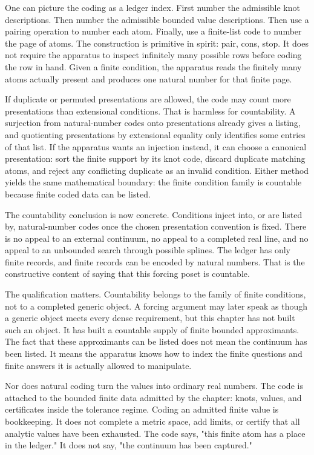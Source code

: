 One can picture the coding as a ledger index. First number the admissible knot
descriptions. Then number the admissible bounded value descriptions. Then use a
pairing operation to number each atom. Finally, use a finite-list code to number
the page of atoms. The construction is primitive in spirit: pair, cons, stop.
It does not require the apparatus to inspect infinitely many possible rows
before coding the row in hand. Given a finite condition, the apparatus reads
the finitely many atoms actually present and produces one natural number for
that finite page.

If duplicate or permuted presentations are allowed, the code may count more
presentations than extensional conditions. That is harmless for countability. A
surjection from natural-number codes onto presentations already gives a
listing, and quotienting presentations by extensional equality only identifies
some entries of that list. If the apparatus wants an injection instead, it can
choose a canonical presentation: sort the finite support by its knot code,
discard duplicate matching atoms, and reject any conflicting duplicate as an
invalid condition. Either method yields the same mathematical boundary: the
finite condition family is countable because finite coded data can be listed.

The countability conclusion is now concrete. Conditions inject into, or are
listed by, natural-number codes once the chosen presentation convention is
fixed. There is no appeal to an external continuum, no appeal to a completed
real line, and no appeal to an unbounded search through possible splines. The
ledger has only finite records, and finite records can be encoded by natural
numbers. That is the constructive content of saying that this forcing poset is
countable.

The qualification matters. Countability belongs to the family of finite
conditions, not to a completed generic object. A forcing argument may later
speak as though a generic object meets every dense requirement, but this
chapter has not built such an object. It has built a countable supply of finite
bounded approximants. The fact that these approximants can be listed does not
mean the continuum has been listed. It means the apparatus knows how to index
the finite questions and finite answers it is actually allowed to manipulate.

Nor does natural coding turn the values into ordinary real numbers. The code is
attached to the bounded finite data admitted by the chapter: knots, values, and
certificates inside the tolerance regime. Coding an admitted finite value is
bookkeeping. It does not complete a metric space, add limits, or certify that
all analytic values have been exhausted. The code says, "this finite atom has a
place in the ledger." It does not say, "the continuum has been captured."

